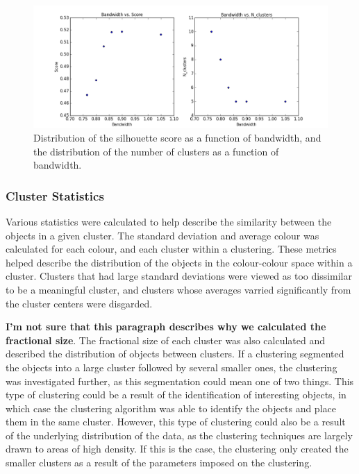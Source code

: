 \begin{figure}[H]
\centering
\includegraphics[width=\linewidth]{figs/methods/meanshift_parameters}
\caption{Distribution of the silhouette score as a function of bandwidth, and the distribution of the number of clusters as a function of bandwidth.}
\label{fig:bwscore}
\end{figure}

\subsubsection{Cluster Statistics}
Various statistics were calculated to help describe the similarity between the objects in a given cluster.
The standard deviation and average colour was calculated for each colour, and each cluster within a clustering. 
These metrics helped describe the distribution of the objects in the colour-colour space within a cluster. 
Clusters that had large standard deviations were viewed as too dissimilar to be a meaningful cluster, and clusters whose averages varried significantly from the cluster centers were disgarded.

\textbf{I'm not sure that this paragraph describes why we calculated the fractional size}.
The fractional size of each cluster was also calculated and described the distribution of objects between clusters.
If a clustering segmented the objects into a large cluster followed by several smaller ones, the clustering was investigated further, as this segmentation could mean one of two things. 
This type of clustering could be a result of the identification of interesting objects, in which case the clustering algorithm was able to identify the objects and place them in the same cluster.
However, this type of clustering could also be a result of the underlying distribution of the data, as the clustering techniques are largely drawn to areas of high density.
If this is the case, the clustering only created the smaller clusters as a result of the parameters imposed on the clustering.
